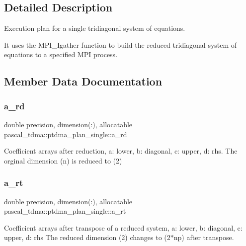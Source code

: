 \subsection{Detailed Description}
Execution plan for a single tridiagonal system of equations. 

It uses the M\+P\+I\+\_\+\+Igather function to build the reduced tridiagonal system of equations to a specified M\+PI process. 

\subsection{Member Data Documentation}
\mbox{\label{structpascal__tdma_1_1ptdma__plan__single_a732d93dcbef429c1396a6f7ace9cefa6}} 
\subsubsection{\texorpdfstring{a\+\_\+rd}{a\_rd}}
{\footnotesize\ttfamily double precision, dimension(\+:), allocatable pascal\+\_\+tdma\+::ptdma\+\_\+plan\+\_\+single\+::a\+\_\+rd}



Coefficient arrays after reduction, a\+: lower, b\+: diagonal, c\+: upper, d\+: rhs. The orginal dimension (n) is reduced to (2) 

\mbox{\label{structpascal__tdma_1_1ptdma__plan__single_ad8bed95f594c23d7df9467e204025a74}} 
\subsubsection{\texorpdfstring{a\+\_\+rt}{a\_rt}}
{\footnotesize\ttfamily double precision, dimension(\+:), allocatable pascal\+\_\+tdma\+::ptdma\+\_\+plan\+\_\+single\+::a\+\_\+rt}



Coefficient arrays after transpose of a reduced system, a\+: lower, b\+: diagonal, c\+: upper, d\+: rhs The reduced dimension (2) changes to (2$\ast$np) after transpose. 

